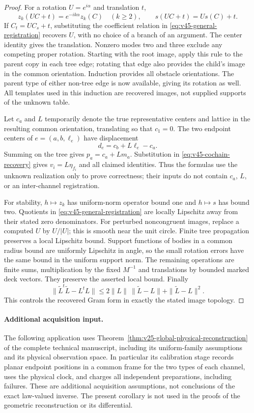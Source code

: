 \begin{proof}
For a rotation $U=e^{i\alpha}$ and translation $t$,
\[
 z_k(UC+t)=e^{-ik\alpha}z_k(C)\quad(k\ge2),
 \qquad s(UC+t)=Us(C)+t.
\]
If $C_t=UC_s+t$, substituting the coefficient relation in
\eqref{eq:v45-general-registration} recovers $U$, with no choice of a
branch of an argument.  The center identity gives the translation.
Nonzero modes two and three exclude any competing proper rotation.
Starting with the root image, apply this rule to the parent copy in
each tree edge; rotating that edge also provides the child's image in
the common orientation.  Induction provides all obstacle orientations.
The parent type of either non-tree edge is now available, giving its
rotation as well.  All templates used in this induction are recovered
images, not supplied supports of the unknown table.

Let $c_a$ and $L$ temporarily denote the true representative centers and
lattice in the resulting common orientation, translating so that $c_1=0$.
The two endpoint centers of $e=(a,b,\ell_e)$ have displacement
\[
                         d_e=c_b+L\ell_e-c_a.
\]
Summing on the tree gives $p_a=c_a+Lm_a$.  Substitution in
\eqref{eq:v45-cochain-recovery} gives $v_i=L\eta_{f_i}$ and all claimed
identities.  Thus the formulas use the unknown realization only to prove
correctness; their inputs do not contain $c_a$, $L$, or an inter-channel
registration.

For stability, $h\mapsto z_k$ has uniform-norm operator bound one and
$h\mapsto s$ has bound two.  Quotients in
\eqref{eq:v45-general-registration} are locally Lipschitz away from their
stated zero denominators.  For perturbed noncongruent images, replace a
computed $U$ by $U/|U|$; this is smooth near the unit circle.  Finite tree
propagation preserves a local Lipschitz bound.  Support functions of
bodies in a common radius bound are uniformly Lipschitz in angle, so the
small rotation errors have the same bound in the uniform support norm.
The remaining operations are finite sums, multiplication by the fixed
$M^{-1}$ and translations by bounded marked deck vectors.  They preserve
the asserted local bound.  Finally
\[
 \|\widetilde L^t\widetilde L-L^tL\|
 \le2\|L\|\,\|\widetilde L-L\|+\|\widetilde L-L\|^2.
\]
This controls the recovered Gram form in exactly the stated image topology.
\end{proof}

\paragraph{Additional acquisition input.}
The following application uses
Theorem~\ref{thm:v25-global-physical-reconstruction} of the complete
technical manuscript, including its uniform-family assumptions and its
physical observation space.  In particular its calibration stage records
planar endpoint positions in a common frame for the two types of each
channel, uses the physical clock, and charges all independent preparations,
including failures.  These are additional acquisition assumptions, not
conclusions of the exact law-valued inverse.  The present corollary is not
used in the proofs of the geometric reconstruction or its differential.


